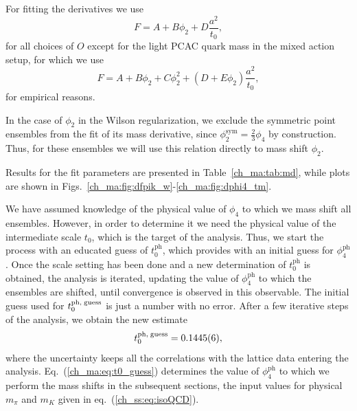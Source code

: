 For fitting the derivatives we use
\begin{equation}
\label{ch_ma:eq:md_1}
F=A+B\phi_2+D\frac{a^2}{t_0},
\end{equation}
for all choices of ${O}$ except for the light PCAC quark mass in the mixed action setup, for which we use
\begin{equation}
\label{ch_ma:eq:md_2}
F=A+B\phi_2+C\phi_2^2+(D+E\phi_2)\frac{a^2}{t_0},
\end{equation}
for empirical reasons.

In the case of $\phi_2$ in the Wilson regularization, we exclude the symmetric point ensembles from the fit of its mass derivative, since $\phi_2^{\textrm{sym}}=\frac{2}{3}\phi_4$ by construction. Thus, for these ensembles we will use this relation directly to mass shift $\phi_2$.

Results for the fit parameters are presented in Table~\ref{ch_ma:tab:md}, while plots are shown in Figs.~\ref{ch_ma:fig:dfpik_w}-\ref{ch_ma:fig:dphi4_tm}.

We have assumed knowledge of the physical value of $\phi_4$ to which we mass shift all ensembles. However, in order to determine it we need the physical value of the intermediate scale $t_0$, which is the target of the analysis. Thus, we start the process with an educated guess of $t_0^{\textrm{ph}}$, which provides with an initial guess for $\phi_4^{\textrm{ph}}$. Once the scale setting has been done and a new determination of $t_0^{\textrm{ph}}$ is obtained, the analysis is iterated, updating the value of $\phi_4^{\textrm{ph}}$ to which the ensembles are shifted, until convergence is observed in this observable. The initial guess used for $t_0^{\textrm{ph,\;guess}}$ is just a number with no error. After a few iterative steps of the analysis, we obtain the new estimate
\begin{equation}
\label{ch_ma:eq:t0_guess}
t_0^{\textrm{ph,\;guess}}=0.1445(6),
\end{equation}
where the uncertainty keeps all the correlations with the lattice data entering the analysis. Eq.~(\ref{ch_ma:eq:t0_guess}) determines the value of $\phi_4^{\textrm{ph}}$ to which we perform the mass shifts in the subsequent sections, the input values for physical $m_{\pi}$ and $m_K$ given in eq.~(\ref{ch_ss:eq:isoQCD}). 

